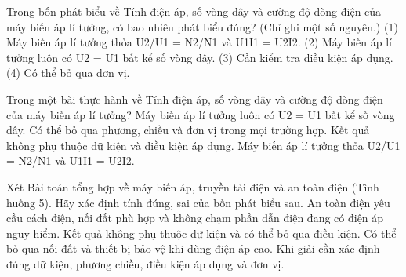 \begin{ex}
Trong bốn phát biểu về Tính điện áp, số vòng dây và cường độ dòng điện của máy biến áp lí tưởng, có bao nhiêu phát biểu đúng? (Chỉ ghi một số nguyên.) (1) Máy biến áp lí tưởng thỏa U2/U1 = N2/N1 và U1I1 = U2I2. (2) Máy biến áp lí tưởng luôn có U2 = U1 bất kể số vòng dây. (3) Cần kiểm tra điều kiện áp dụng. (4) Có thể bỏ qua đơn vị.
\end{ex}

\begin{ex}
Trong một bài thực hành về Tính điện áp, số vòng dây và cường độ dòng điện của máy biến áp lí tưởng?
\choice
{Máy biến áp lí tưởng luôn có U2 = U1 bất kể số vòng dây.}
{Có thể bỏ qua phương, chiều và đơn vị trong mọi trường hợp.}
{Kết quả không phụ thuộc dữ kiện và điều kiện áp dụng.}
{\True Máy biến áp lí tưởng thỏa U2/U1 = N2/N1 và U1I1 = U2I2.}
\end{ex}

\begin{ex}
Xét Bài toán tổng hợp về máy biến áp, truyền tải điện và an toàn điện (Tình huống 5). Hãy xác định tính đúng, sai của bốn phát biểu sau.
\choiceTF
{\True An toàn điện yêu cầu cách điện, nối đất phù hợp và không chạm phần dẫn điện đang có điện áp nguy hiểm.}
{Kết quả không phụ thuộc dữ kiện và có thể bỏ qua điều kiện.}
{Có thể bỏ qua nối đất và thiết bị bảo vệ khi dùng điện áp cao.}
{\True Khi giải cần xác định đúng dữ kiện, phương chiều, điều kiện áp dụng và đơn vị.}
\end{ex}

